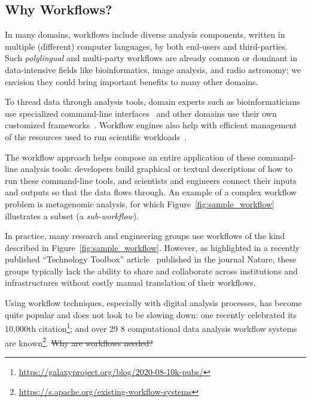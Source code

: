 \documentclass[sigconf,revew,screen,timestamp,nonacm]{acmart}
\newcommand{\addition}[1]{{\color{brown} #1}}
\newcommand{\modification}[1]{{\color{blue} #1}}
\newcommand{\deletion}[1]{{\color{red} \sout{#1}}}
\newcommand{\todortwo}[1]{\todo[linecolor=white,color=KamPurple!40]{R2.#1}}
\begin{document}
\subsection{Why Workflows?}\label{sec:bg:workflows}
\addition{In many domains, workflows include diverse analysis components, written in multiple (different) computer languages, by both end-users and third-parties. Such \emph{polylingual} and multi-party workflows are already common or dominant in data-intensive fields like bioinformatics, image analysis, and radio astronomy; we envision they could bring important benefits to many other domains.

To thread data through analysis tools, domain experts such as bioinformaticians use specialized command-line interfaces~\cite{seemann_ten_2013,georgeson_bionitio_2019} and other domains use their own customized frameworks~\cite{babuji_parsl_2019,berthold_knime_2009}. Workflow engines also help with efficient management of the resources used to run scientific workloads~\cite{deelman_pegasus_2015,couvares_workflow_2007}.

The workflow approach helps compose an entire application of these command-line analysis tools: developers build graphical or textual descriptions of how to run these command-line tools, and scientists and engineers connect their inputs and outputs so that the data flows through. An example of a complex workflow problem is metagenomic analysis, for which Figure~\ref{fig:sample_workflow} illustrates a subset (a \textit{sub-workflow}).

In practice, many research and engineering groups use workflows of the kind described in Figure~\ref{fig:sample_workflow}. However, as highlighted in a recently published ``Technology Toolbox'' article~\cite{perkel_workflow_2019} published in the journal Nature, these groups typically lack the ability to share and collaborate across institutions and infrastructures without costly manual translation of their workflows.}

Using workflow techniques, especially with digital analysis processes, has become quite popular and does not look to be slowing down: one \todortwo{19}{\modification{workflow management system}} recently celebrated its 10,000th citation\footnote{\url{https://galaxyproject.org/blog/2020-08-10k-pubs/}}; and over 29\modification{8} computational \addition{data analysis} workflow systems are known\footnote{\url{https://s.apache.org/existing-workflow-systems}}. \deletion{Why are workflows needed?}
\end{document}
